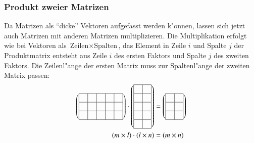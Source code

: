 \subsubsection{Produkt zweier Matrizen}
Da Matrizen als ``dicke'' Vektoren aufgefasst werden k"onnen, lassen
sich jetzt auch Matrizen mit anderen Matrizen multiplizieren.
Die Multiplikation erfolgt wie bei Vektoren als
$\text{Zeilen}\times\text{Spalten}$, das Element in Zeile $i$
und Spalte $j$ der Produktmatrix entsteht aus Zeile $i$ des ersten
Faktors und Spalte $j$ des zweiten Faktors.
Die Zeilenl"ange der ersten Matrix muss zur Spaltenl"ange
der zweiten Matrix passen:
\begin{align*}
\left(\begin{tabular}{|c|c|c|c|c|}
\hline
&&&&\\
\hline
&&&&\\
\hline
&&&&\\
\hline
\end{tabular}\right)
\cdot
\left(\begin{tabular}{|c|c|}
\hline
&\\
\hline
&\\
\hline
&\\
\hline
&\\
\hline
&\\
\hline
\end{tabular}\right)
&=
\left(\begin{tabular}{|c|c|}
\hline
&\\
\hline
&\\
\hline
&\\
\hline
\end{tabular}\right)
\\
(m\times l)\cdot (l\times n)&=(m\times n)
\end{align*}
